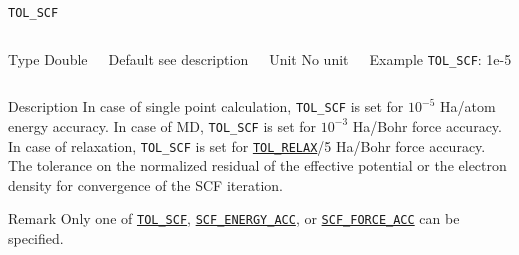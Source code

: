 \begin{frame}[allowframebreaks]{\texttt{TOL\_SCF}} \label{TOL_SCF}
\vspace*{-12pt}
\begin{columns}
\begin{block}{Type}
Double
\end{block}

\begin{block}{Default}
see description
\end{block}

\begin{block}{Unit}
No unit
\end{block}

\begin{block}{Example}
\texttt{TOL\_SCF}: 1e-5
\end{block}
\end{columns}

\begin{block}{Description}
In case of single point calculation, \texttt{TOL\_SCF} is set for $10^{-5}$ Ha/atom energy accuracy.
In case of MD, \texttt{TOL\_SCF} is set for $10^{-3}$ Ha/Bohr force accuracy.
In case of relaxation, \texttt{TOL\_SCF} is set for \hyperlink{TOL_RELAX}{\texttt{TOL\_RELAX}}/5 Ha/Bohr force accuracy. \\
The tolerance on the normalized residual of the effective potential or the electron density for convergence of the SCF iteration. 
\end{block}

\begin{block}{Remark}
Only one of \hyperlink{TOL_SCF}{\texttt{TOL\_SCF}}, \hyperlink{SCF_ENERGY_ACC}{\texttt{SCF\_ENERGY\_ACC}}, or \hyperlink{SCF_FORCE_ACC}{\texttt{SCF\_FORCE\_ACC}} can be specified.
\end{block}

\end{frame}




